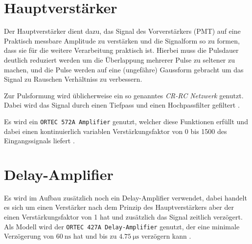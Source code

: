 \section{Hauptverstärker}

Der Hauptverstärker dient dazu, das Signal des Vorverstärkers (PMT) auf eine Praktisch messbare Amplitude zu verstärken und die Signalform so zu formen, dass sie für die weitere Verarbeitung praktisch ist. Hierbei muss die Pulsdauer deutlich reduziert werden um die Überlappung mehrerer Pulse zu seltener zu machen, und die Pulse werden auf eine (ungefähre) Gaussform gebracht um das Signal zu Rauschen Verhältniss zu verbessern\cite[280]{leotechniques}.

Zur Pulsformung wird üblicherweise ein so genanntes \textit{CR-RC Netzwerk} genutzt. Dabei wird das Signal durch einen Tiefpass und einen Hochpassfilter gefiltert \cite[281]{leotechniques}.

Es wird ein \texttt{ORTEC 572A Amplifier} genutzt, welcher diese Funktionen erfüllt und dabei einen kontinuierlich variablen Verstärkungsfaktor von 0 bis 1500 des Eingangssignals liefert \cite{shaping_amp}.

\section{Delay-Amplifier}

Es wird im Aufbau zusätzlich noch ein Delay-Amplifier verwendet, dabei handelt es sich um einen Verstärker nach dem Prinzip des Hauptverstärkers aber der einen Verstärkungsfaktor von 1 hat und zusätzlich das Signal zeitlich verzögert. Als Modell wird der \texttt{ORTEC 427A Delay-Amplifier} genutzt, der eine minimale Verzögerung von $\SI{60}{\nano\s}$ hat und bis zu $\SI{4.75}{\micro\s}$ verzögern kann \cite{delay_amp}.
